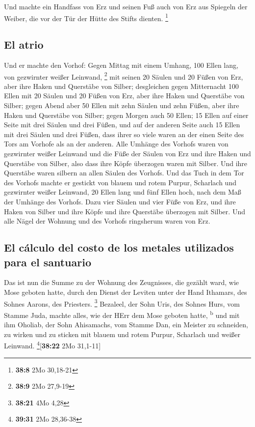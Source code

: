  Und machte ein Handfass von Erz und seinen Fuß auch von
Erz aus Spiegeln der Weiber, die vor der Tür der Hütte des Stifts
dienten. \footnote{\textbf{38:8} 2Mo 30,18-21}

\hypertarget{el-atrio}{%
\subsection{El atrio}\label{el-atrio}}

 Und er machte den Vorhof: Gegen Mittag mit einem Umhang,
100 Ellen lang, von gezwirnter weißer Leinwand, \footnote{\textbf{38:9}
  2Mo 27,9-19}  mit seinen 20 Säulen und 20 Füßen von
Erz, aber ihre Haken und Querstäbe von Silber; 
desgleichen gegen Mitternacht 100 Ellen mit 20 Säulen und 20 Füßen von
Erz, aber ihre Haken und Querstäbe von Silber;  gegen
Abend aber 50 Ellen mit zehn Säulen und zehn Füßen, aber ihre Haken und
Querstäbe von Silber;  gegen Morgen auch 50 Ellen;
 15 Ellen auf einer Seite mit drei Säulen und drei Füßen,
 und auf der anderen Seite auch 15 Ellen mit drei Säulen
und drei Füßen, dass ihrer so viele waren an der einen Seite des Tors am
Vorhofe als an der anderen.  Alle Umhänge des Vorhofs
waren von gezwirnter weißer Leinwand  und die Füße der
Säulen von Erz und ihre Haken und Querstäbe von Silber, also dass ihre
Köpfe überzogen waren mit Silber. Und ihre Querstäbe waren silbern an
allen Säulen des Vorhofs.  Und das Tuch in dem Tor des
Vorhofs machte er gestickt von blauem und rotem Purpur, Scharlach und
gezwirnter weißer Leinwand, 20 Ellen lang und fünf Ellen hoch, nach dem
Maß der Umhänge des Vorhofs.  Dazu vier Säulen und vier
Füße von Erz, und ihre Haken von Silber und ihre Köpfe und ihre
Querstäbe überzogen mit Silber.  Und alle Nägel der
Wohnung und des Vorhofs ringsherum waren von Erz.

\hypertarget{el-cuxe1lculo-del-costo-de-los-metales-utilizados-para-el-santuario}{%
\subsection{El cálculo del costo de los metales utilizados para el
santuario}\label{el-cuxe1lculo-del-costo-de-los-metales-utilizados-para-el-santuario}}

 Das ist nun die Summe zu der Wohnung des Zeugnisses, die
gezählt ward, wie Mose geboten hatte, durch den Dienst der Leviten unter
der Hand Ithamars, des Sohnes Aarons, des Priesters. \footnote{\textbf{38:21}
  4Mo 4,28}  Bezaleel, der Sohn Uris, des Sohnes Hurs,
vom Stamme Juda, machte alles, wie der HErr dem Mose geboten hatte,
\textsuperscript{b}  und mit ihm Oholiab, der Sohn
Ahisamachs, vom Stamme Dan, ein Meister zu schneiden, zu wirken und zu
sticken mit blauem und rotem Purpur, Scharlach und weißer Leinwand.
\footnote{\textbf{39:31} 2Mo 28,36-38}{[}\textbf{38:22} 2Mo 31,1-11{]}

